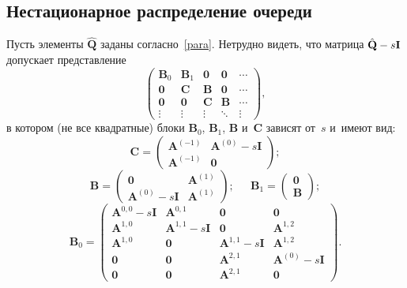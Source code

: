 \begin{multicols}{2}
\section{Нестационарное распределение очереди}


Пусть элементы $\hat{\mathbf{Q}}$ заданы согласно~\eqref{para}.
Нетрудно видеть, что мат\-ри\-ца ${{\hat{\mathbf{Q}}}\hm -s \mathbf{I}}$ допускает пред\-став\-ле\-ние
\begin{equation}
\label{qhatnew}
\begin{pmatrix}
\mathbf{B}_0 & \mathbf{B}_1 & \mathbf{0} & \mathbf{0} &\cdots \\
\mathbf{0} & \mathbf{C} & \mathbf{B} & \mathbf{0} &\cdots \\
\mathbf{0} & \mathbf{0} & \mathbf{C} & \mathbf{B} & \cdots \\
\vdots & \vdots & \vdots & \ddots  & \vdots
\end{pmatrix},
\end{equation}
в котором (не все квадратные) блоки $\mathbf{B}_0$, $\mathbf{B}_1$, $\mathbf{B}$ и~$\mathbf{C}$ зависят от~$s$ и~имеют вид:
$$
\mathbf{C}=
\begin{pmatrix}
\mathbf{A}^{(-1)} & \mathbf{A}^{(0)} \!-\! s \mathbf{I} \\
\mathbf{A}^{(-1)} &\mathbf{0}
\end{pmatrix};
$$
$$
\mathbf{B}
\!=\!
\begin{pmatrix}
\mathbf{0} & \mathbf{A}^{(1)} \\
\mathbf{A}^{(0)} \!-\! s \mathbf{I} & \mathbf{A}^{(1)}
\end{pmatrix};\quad
\ \
\mathbf{B}_1
\!=\!
\begin{pmatrix}
\mathbf{0}  \\
\mathbf{B}
\end{pmatrix};
$$
$$ 
\mathbf{B}_0
\!=\!
\begin{pmatrix}
    \mathbf{A}^{0,0} \!-\! s \mathbf{I} & \mathbf{A}^{0,1} & \mathbf{0} & \mathbf{0}\\
    \mathbf{A}^{1,0} & \mathbf{A}^{1,1}\!-\!s \mathbf{I} & \mathbf{0} & \mathbf{A}^{1,2} \\
    \mathbf{A}^{1,0} & \mathbf{0} & \mathbf{A}^{1,1} \!-\! s \mathbf{I} & \mathbf{A}^{1,2} \\
    \mathbf{0} & \mathbf{0} & \mathbf{A}^{2,1} &\mathbf{A}^{(0)} \!-\! s \mathbf{I}\\
    \mathbf{0} & \mathbf{0} & \mathbf{A}^{2,1} & \mathbf{0}
    \end{pmatrix}.
    $$
    

\end{multicols}
